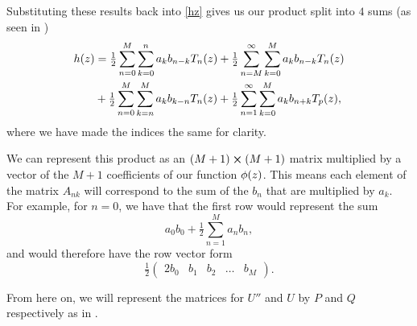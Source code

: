 Substituting these results back into \eqref{hz} gives us our product split into $ 4 $ sums (as seen in \citet{bukhari1997spectral})
\begin{align}
    h(z) &= \tfrac{1}{2} \sum^{M}_{n=0} \sum^n_{k=0} a_k b_{n - k} T_{n}(z) + \tfrac{1}{2} \sum^\infty_{n=M} \sum^M_{k=0} a_k b_{n -k} T_{n}(z) \\ &+ \tfrac{1}{2} \sum^M_{n=0} \sum^M_{k=n} a_k b_{k - n} T_{n}(z) + \tfrac{1}{2} \sum^\infty_{n=1} \sum^M_{k=0} a_k b_{n+k} T_{p}(z),
\end{align}
where we have made the indices the same for clarity.

We can represent this product as an $ (M+1) \cross (M+1) $ matrix multiplied by a vector of the $ M + 1 $ coefficients of our function $ \phi(z)$. This means each element of the matrix $ A_{nk} $ will correspond to the sum of the $ b_n $ that are multiplied by $ a_k$. For example, for $ n = 0$, we have that the first row would represent the sum
\begin{equation}
    a_0 b_0 + \tfrac{1}{2} \sum^M_{n = 1} a_n b_n,
\end{equation}
and would therefore have the row vector form
\begin{equation}
    \tfrac{1}{2} \begin{pmatrix}
        2b_0 & b_1 & b_2 & \dots & b_{M}
    \end{pmatrix}.
\end{equation}

From here on, we will represent the matrices for $ U'' $ and $ U$ by $ P $ and $ Q $ respectively as in \citet{bukhari1997spectral}.




